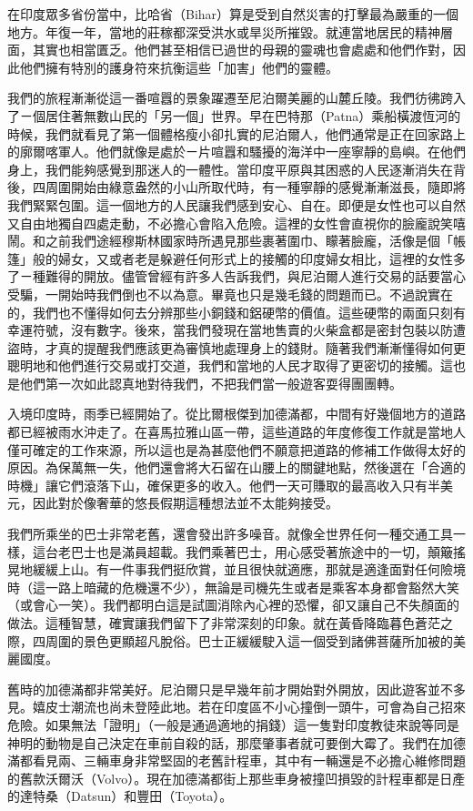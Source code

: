 在印度眾多省份當中，比哈省（Bihar）算是受到自然災害的打擊最為嚴重的一個地方。年復一年，當地的莊稼都深受洪水或旱災所摧毀。就連當地居民的精神層面，其實也相當匱乏。他們甚至相信已過世的母親的靈魂也會處處和他們作對，因此他們擁有特別的護身符來抗衡這些「加害」他們的靈體。

我們的旅程漸漸從這一番喧囂的景象躍遷至尼泊爾美麗的山麓丘陵。我們彷彿跨入了ㄧ個居住著無數山民的「另一個」世界。早在巴特那（Patna）乘船橫渡恆河的時候，我們就看見了第一個體格瘦小卻扎實的尼泊爾人，他們通常是正在回家路上的廓爾喀軍人。他們就像是處於ㄧ片喧囂和騷擾的海洋中一座寧靜的島嶼。在他們身上，我們能夠感覺到那迷人的一體性。當印度平原與其困惑的人民逐漸消失在背後，四周圍開始由綠意盎然的小山所取代時，有一種寧靜的感覺漸漸滋長，隨即將我們緊緊包圍。這一個地方的人民讓我們感到安心、自在。即便是女性也可以自然又自由地獨自四處走動，不必擔心會陷入危險。這裡的女性會直視你的臉龐說笑嘻鬧。和之前我們途經穆斯林國家時所遇見那些裹著圍巾、矇著臉龐，活像是個「帳篷」般的婦女，又或者老是躲避任何形式上的接觸的印度婦女相比，這裡的女性多了ㄧ種難得的開放。儘管曾經有許多人告訴我們，與尼泊爾人進行交易的話要當心受騙，一開始時我們倒也不以為意。畢竟也只是幾毛錢的問題而已。不過說實在的，我們也不懂得如何去分辨那些小銅錢和鋁硬幣的價值。這些硬幣的兩面只刻有幸運符號，沒有數字。後來，當我們發現在當地售賣的火柴盒都是密封包裝以防遭盜時，才真的提醒我們應該更為審慎地處理身上的錢財。隨著我們漸漸懂得如何更聰明地和他們進行交易或打交道，我們和當地的人民才取得了更密切的接觸。這也是他們第一次如此認真地對待我們，不把我們當一般遊客耍得團團轉。

入境印度時，雨季已經開始了。從比爾根傑到加德滿都，中間有好幾個地方的道路都已經被雨水沖走了。在喜馬拉雅山區一帶，這些道路的年度修復工作就是當地人僅可確定的工作來源，所以這也是為甚麼他們不願意把道路的修補工作做得太好的原因。為保萬無一失，他們還會將大石留在山腰上的關鍵地點，然後選在「合適的時機」讓它們滾落下山，確保更多的收入。他們一天可賺取的最高收入只有半美元，因此對於像奢華的悠長假期這種想法並不太能夠接受。

我們所乘坐的巴士非常老舊，還會發出許多噪音。就像全世界任何一種交通工具一樣，這台老巴士也是滿員超載。我們乘著巴士，用心感受著旅途中的一切，顛簸搖晃地緩緩上山。有一件事我們挺欣賞，並且很快就適應，那就是適逢面對任何險境時（這一路上暗藏的危機還不少），無論是司機先生或者是乘客本身都會豁然大笑（或會心一笑）。我們都明白這是試圖消除內心裡的恐懼，卻又讓自己不失顏面的做法。這種智慧，確實讓我們留下了非常深刻的印象。就在黃昏降臨暮色蒼茫之際，四周圍的景色更顯超凡脫俗。巴士正緩緩駛入這一個受到諸佛菩薩所加被的美麗國度。

舊時的加德滿都非常美好。尼泊爾只是早幾年前才開始對外開放，因此遊客並不多見。嬉皮士潮流也尚未登陸此地。若在印度區不小心撞倒一頭牛，可會為自己招來危險。如果無法「證明」（一般是通過適地的捐錢）這一隻對印度教徒來說等同是神明的動物是自己決定在車前自殺的話，那麼肇事者就可要倒大霉了。我們在加德滿都看見兩、三輛車身非常堅固的老舊計程車，其中有一輛還是不必擔心維修問題的舊款沃爾沃（Volvo）。現在加德滿都街上那些車身被撞凹損毀的計程車都是日產的達特桑（Datsun）和豐田（Toyota）。

